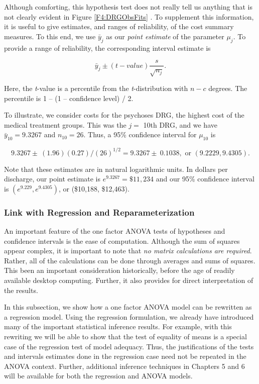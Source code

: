 Although comforting, this hypothesis test does not really tell us
anything that is not clearly evident in Figure \ref{F4:DRGObsFits} .
To supplement this information, it is useful to give estimates, and
ranges of reliability, of the cost summary measures. To this end, we
use $\bar{y}_{j}$ as our \textit{point estimate} of the parameter
$\mu_{j}$. To provide a range of reliability, the corresponding
interval estimate is

\begin{equation*}
\bar{y}_{j}\pm (t-value)\frac{s}{\sqrt{n_{j}}}.
\end{equation*}

\noindent Here, the \textit{t}-value is a percentile from the
\textit{t}-distribution with $n-c$ degrees. The percentile is 1 --
(1 -- confidence level) / 2.

To illustrate, we consider costs for the psychoses DRG, the highest cost of
the medical treatment groups. This was the $j=$ 10th DRG, and we have $\bar{y%
}_{10}=9.3267$ and $n_{10}=26$. Thus, a 95\% confidence interval for $\mu
_{10}$ is

\begin{equation*}
9.3267\pm \ (1.96)(0.27)/(26)^{1/2}=9.3267\pm \ 0.1038,\text{ or }%
(9.2229,9.4305).
\end{equation*}

Note that these estimates are in natural logarithmic units. In dollars per
discharge, our point estimate is $e^{9.3267}=\$11,234$ and our 95\%
confidence interval is $(e^{9.229},e^{9.4305})$, or (\$10,188, \$12,463).

\subsubsection*{Link with Regression and Reparameterization}

An important feature of the one factor ANOVA tests of hypotheses and
confidence intervals is the ease of computation. Although the sum of
squares appear complex, it is important to note that \emph{no matrix
calculations are required}. Rather, all of the calculations can be
done through averages and sums of squares. This been an important
consideration historically, before the age of readily available
desktop computing. Further, it also provides for direct
interpretation of the results.

In this subsection, we show how a one factor ANOVA model can be
rewritten as a regression model. Using the regression formulation,
we already have introduced many of the important statistical
inference results. For example, with this rewriting we will be able
to show that the test of equality of means is a special case of the
regression test of model adequacy. Thus, the justifications of the
tests and intervals estimates done in the regression case need not
be repeated in the ANOVA context. Further, additional inference
techniques in Chapters 5 and 6 will be available for both the
regression and ANOVA models.

